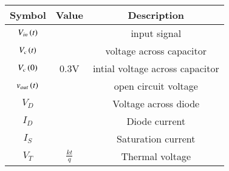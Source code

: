 \begin{tabular}{|c|c|c|}
    \hline
            \textbf{Symbol} & \textbf{Value} & \textbf{Description} \\
    \hline
          $V_{in}\left(t\right)$ &  & input signal\\
    \hline
          $V_c\left(t\right)$ &  & voltage across capacitor\\
    \hline 
          $V_c\left(0\right)$ &$0.3$V &intial voltage across capacitor\\
    \hline
          $v_{out}\left(t\right)$ & &open circuit voltage\\
    \hline  
    $V_D$    & &Voltage across diode\\
    \hline
    $I_D$& &Diode current \\
    \hline
    $I_S$& &Saturation current \\
    \hline
    $V_T$&$\frac{kt}{q}$ &Thermal voltage \\
    \hline
  \end{tabular}
